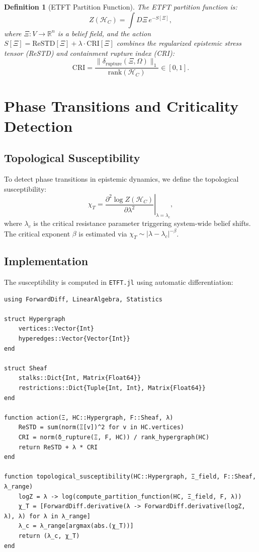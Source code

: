 \documentclass[12pt]{article}
\newcommand{\rank}{\text{rank}}
\newtheorem{definition}[theorem]{Definition}
\begin{document}
\begin{definition}[ETFT Partition Function]
The ETFT partition function is:
\[
Z(\mathcal{H}_C) = \int D\Xi \, e^{-S[\Xi]},
\]
where \(\Xi: V \to \mathbb{R}^n\) is a belief field, and the action \(S[\Xi] = \text{ReSTD}[\Xi] + \lambda \cdot \text{CRI}[\Xi]\) combines the regularized epistemic stress tensor (ReSTD) and containment rupture index (CRI):
\[
\text{CRI} = \frac{\|\delta_{\text{rupture}}(\Xi, \Omega)\|_1}{\rank(\mathcal{H}_C)} \in [0,1].
\]
\end{definition}

\section{Phase Transitions and Criticality Detection}
\subsection{Topological Susceptibility}
To detect phase transitions in epistemic dynamics, we define the topological susceptibility:
\[
\chi_T = \left. \frac{\partial^2 \log Z(\mathcal{H}_C)}{\partial \lambda^2} \right|_{\lambda = \lambda_c},
\]
where \(\lambda_c\) is the critical resistance parameter triggering system-wide belief shifts. The critical exponent \(\beta\) is estimated via \(\chi_T \sim |\lambda - \lambda_c|^{-\beta}\).

\subsection{Implementation}
The susceptibility is computed in \texttt{ETFT.jl} using automatic differentiation:

\begin{verbatim}
using ForwardDiff, LinearAlgebra, Statistics

struct Hypergraph
    vertices::Vector{Int}
    hyperedges::Vector{Vector{Int}}
end

struct Sheaf
    stalks::Dict{Int, Matrix{Float64}}
    restrictions::Dict{Tuple{Int, Int}, Matrix{Float64}}
end

function action(Ξ, HC::Hypergraph, F::Sheaf, λ)
    ReSTD = sum(norm(Ξ[v])^2 for v in HC.vertices)
    CRI = norm(δ_rupture(Ξ, F, HC)) / rank_hypergraph(HC)
    return ReSTD + λ * CRI
end

function topological_susceptibility(HC::Hypergraph, Ξ_field, F::Sheaf, λ_range)
    logZ = λ -> log(compute_partition_function(HC, Ξ_field, F, λ))
    χ_T = [ForwardDiff.derivative(λ -> ForwardDiff.derivative(logZ, λ), λ) for λ in λ_range]
    λ_c = λ_range[argmax(abs.(χ_T))]
    return (λ_c, χ_T)
end
\end{verbatim}
\end{document}
